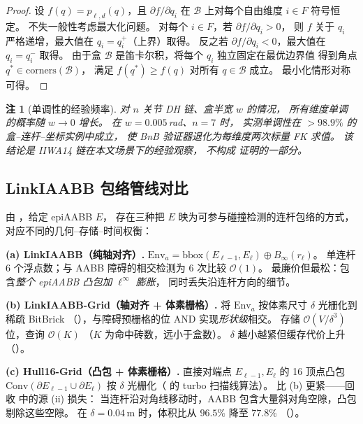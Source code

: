 \documentclass[journal]{IEEEtran}
\newtheorem{remark}{注}
\begin{document}
\begin{proof}
设 $f(q) = p_{\ell,d}(q)$，且 $\partial f / \partial q_i$
在 $\mathcal{B}$ 上对每个自由维度 $i \in F$ 符号恒定。
不失一般性考虑最大化问题。
对每个 $i \in F$，若 $\partial f / \partial q_i > 0$，
则 $f$ 关于 $q_i$ 严格递增，最大值在 $q_i = q_i^+$（上界）取得。
反之若 $\partial f / \partial q_i < 0$，最大值在 $q_i = q_i^-$ 取得。
由于盒 $\mathcal{B}$ 是笛卡尔积，将每个 $q_i$ 独立固定在最优边界值
得到角点 $q^* \in \mathrm{corners}(\mathcal{B})$，
满足 $f(q^*) \geq f(q)$ 对所有 $q \in \mathcal{B}$ 成立。
最小化情形对称可得。
\end{proof}

\begin{remark}[单调性的经验频率]\label{rem:mono_freq}
对 $n$ 关节 DH 链、盒半宽 $w$ 的情况，
所有维度单调的概率随 $w \to 0$ 增长。
在 $w = 0.005\,$rad、$n = 7$ 时，
实测单调性在 $>98.9\%$ 的盒--连杆--坐标实例中成立，
使 BnB 验证器退化为每维度两次标量 FK 求值。
该结论是 IIWA14 链在本文场景下的经验观察，
不构成  证明的一部分。
\end{remark}

\subsection{LinkIAABB 包络管线对比}\label{sec:envelope_compare}

由 ，给定 epiAABB $E$，
存在三种把 $E$ 映为可参与碰撞检测的连杆包络的方式，
对应不同的几何--存储--时间权衡：

\textbf{(a) LinkIAABB（纯轴对齐）.}
$\mathrm{Env}_a=\mathrm{bbox}(E_{\ell-1},E_\ell)\oplus B_\infty(r_\ell)$。
单连杆 6 个浮点数；与 AABB 障碍的相交检测为
6 次比较 $\mathcal{O}(1)$。
最廉价但最松：包含\emph{整个 epiAABB 凸包加 $\ell^\infty$ 膨胀}，
同时丢失沿连杆方向的细节。

\textbf{(b) LinkIAABB-Grid（轴对齐 + 体素栅格）.}
将 $\mathrm{Env}_a$ 按体素尺寸 $\delta$ 光栅化到稀疏 BitBrick
（），与障碍预栅格的位 AND 实现\emph{形状级}相交。
存储 $\mathcal{O}(V/\delta^3)$ 位，查询 $\mathcal{O}(K)$
（$K$ 为命中砖数，远小于盒数）。
$\delta$ 越小越紧但缓存代价上升（）。

\textbf{(c) Hull16-Grid（凸包 + 体素栅格）.}
直接对端点 $E_{\ell-1},E_\ell$ 的 16 顶点凸包
$\mathrm{Conv}(\partial E_{\ell-1}\cup\partial E_\ell)$
按 $\delta$ 光栅化（ 的 turbo 扫描线算法）。
比 (b) 更紧——回收  中的源 (ii) 损失：
当连杆沿对角线移动时，AABB 包含大量斜对角空隙，凸包剔除这些空隙。
在 $\delta=0.04$\,m 时，体积比从 $96.5\%$ 降至 $77.8\%$
（）。
\end{document}
